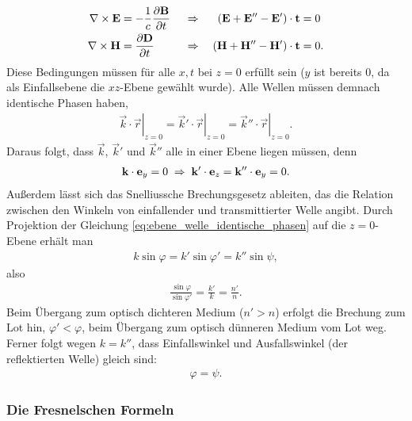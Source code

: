 \begin{align}
    \label{eq:ebene_welle_RB_stetige_tangentialkomponenten}
    \begin{aligned}
        \nabla\times \mathbf{E} & = -\frac{1}{c}\frac{\partial\mathbf{B}}{\partial t} &  & \;\Rightarrow\; & \left(\mathbf{E}+\mathbf{E}''-\mathbf{E}'\right)\cdot \mathbf{t} & =0  \\
        \nabla\times \mathbf{H} & =\frac{\partial\mathbf{D}}{\partial t}              &  & \;\Rightarrow\; & \left(\mathbf{H}+\mathbf{H}''-\mathbf{H}'\right)\cdot \mathbf{t} & =0.
    \end{aligned}
\end{align}
Diese Bedingungen müssen für alle $x,t$ bei $z=0$ erfüllt sein ($y$ ist bereits 0, da als Einfallsebene die $xz$-Ebene gewählt wurde). Alle Wellen müssen demnach identische Phasen haben,
\begin{align}
    \label{eq:ebene_welle_identische_phasen}
    \boxed{\left.\vec k\cdot\vec r\right|_{z=0}=\left.\vec k'\cdot\vec r\right|_{z=0}=\left.\vec k''\cdot\vec r\right|_{z=0}.}
\end{align}
Daraus folgt, dass $\vec k$, $\vec k'$ und $\vec k''$ alle in einer Ebene liegen müssen, denn
\begin{align*}
    \mathbf{k}\cdot \mathbf{e}_y=0 \;\Rightarrow\; \mathbf{k}'\cdot \mathbf{e}_z=\mathbf{k}''\cdot \mathbf{e}_y=0.
\end{align*}
Außerdem lässt sich das Snelliussche Brechungsgesetz ableiten, das die Relation zwischen den Winkeln von einfallender und transmittierter Welle angibt.
Durch Projektion der Gleichung \eqref{eq:ebene_welle_identische_phasen} auf die $z=0$-Ebene erhält man
\begin{align*}
    k \sin\varphi = k' \sin\varphi' = k''\sin\psi,
\end{align*}
also
\begin{align}
    \label{eq:snelliussches_brechungsgesetz}
    \boxed{\frac{\sin\varphi}{\sin\varphi'}=\frac{k'}{k}=\frac{n'}{n}.}
\end{align}
Beim Übergang zum optisch dichteren Medium ($n'>n$) erfolgt die Brechung zum Lot hin, $\varphi'<\varphi$, beim Übergang zum optisch dünneren Medium vom Lot weg.
Ferner folgt wegen $k=k''$, dass Einfallswinkel und Ausfallswinkel (der reflektierten Welle) gleich sind:
\begin{align*}
    \varphi=\psi.
\end{align*}



\subsubsection{Die Fresnelschen Formeln}


